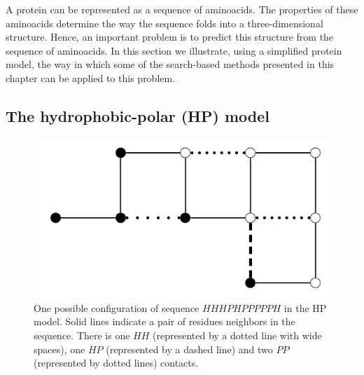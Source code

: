  A protein can be represented as a sequence of aminoacids. The properties of these aminoacids determine the way the sequence folds into a three-dimensional structure. Hence, an important problem is to predict this structure from the sequence of aminoacids. In this section we illustrate, using a simplified protein model, the way in which some of the search-based methods presented in this chapter can be applied to this problem. 

 \subsection{The hydrophobic-polar (HP) model}

\begin{figure}[htbp]
 \begin{center}
 \includegraphics[width=.7\textwidth]{"Part 2 - Search-Based Optimization/Other Search-Based Optimization Approaches/images/HP_Model.png"}
%
%
%
%
 
    \caption{One possible configuration of  sequence  $HHHPHPPPPPH$  in   the HP model. Solid lines indicate a pair of residues neighbors in the sequence. There is   one $HH$ (represented by a dotted line with wide spaces), one $HP$ (represented by a dashed line) and  two $PP$ (represented by dotted lines) contacts.}
 \label{fig:PROTEXAM}
  \end{center}
\end{figure}




